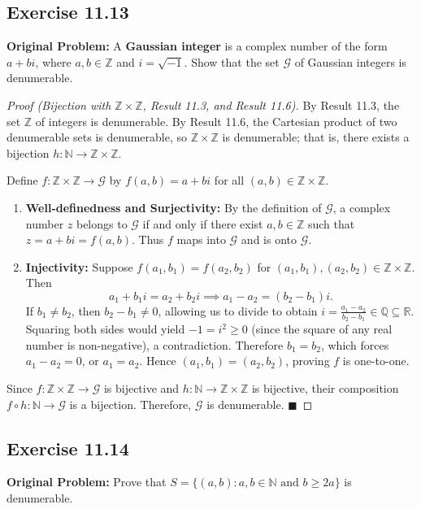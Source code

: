 \documentclass[11pt, letterpaper]{article}
\theoremstyle{definition}
\theoremstyle{remark}
\begin{document}
\subsection*{Exercise 11.13}
\textbf{Original Problem:} A \textbf{Gaussian integer} is a complex number of the form $a + bi$, where $a, b \in \mathbb{Z}$ and $i = \sqrt{-1}$. Show that the set $\mathcal{G}$ of Gaussian integers is denumerable.

\begin{proof}[Proof (Bijection with $\mathbb{Z} \times \mathbb{Z}$, Result 11.3, and Result 11.6)]
By Result 11.3, the set $\mathbb{Z}$ of integers is denumerable. By Result 11.6, the Cartesian product of two denumerable sets is denumerable, so $\mathbb{Z} \times \mathbb{Z}$ is denumerable; that is, there exists a bijection $h : \mathbb{N} \to \mathbb{Z} \times \mathbb{Z}$.

Define $f : \mathbb{Z} \times \mathbb{Z} \to \mathcal{G}$ by $f(a, b) = a + bi$ for all $(a, b) \in \mathbb{Z} \times \mathbb{Z}$.
\begin{enumerate}[label=(\arabic*)]
    \item \textbf{Well-definedness and Surjectivity:} By the definition of $\mathcal{G}$, a complex number $z$ belongs to $\mathcal{G}$ if and only if there exist $a, b \in \mathbb{Z}$ such that $z = a + bi = f(a, b)$. Thus $f$ maps into $\mathcal{G}$ and is onto $\mathcal{G}$.
    
    \item \textbf{Injectivity:} Suppose $f(a_1, b_1) = f(a_2, b_2)$ for $(a_1, b_1), (a_2, b_2) \in \mathbb{Z} \times \mathbb{Z}$. Then
    \[
    a_1 + b_1 i = a_2 + b_2 i \implies a_1 - a_2 = (b_2 - b_1)i.
    \]
    If $b_1 \neq b_2$, then $b_2 - b_1 \neq 0$, allowing us to divide to obtain $i = \frac{a_1 - a_2}{b_2 - b_1} \in \mathbb{Q} \subseteq \mathbb{R}$. Squaring both sides would yield $-1 = i^2 \geq 0$ (since the square of any real number is non-negative), a contradiction. Therefore $b_1 = b_2$, which forces $a_1 - a_2 = 0$, or $a_1 = a_2$. Hence $(a_1, b_1) = (a_2, b_2)$, proving $f$ is one-to-one.
\end{enumerate}
Since $f : \mathbb{Z} \times \mathbb{Z} \to \mathcal{G}$ is bijective and $h : \mathbb{N} \to \mathbb{Z} \times \mathbb{Z}$ is bijective, their composition $f \circ h : \mathbb{N} \to \mathcal{G}$ is a bijection. Therefore, $\mathcal{G}$ is denumerable. $\blacksquare$
\end{proof}

\subsection*{Exercise 11.14}
\textbf{Original Problem:} Prove that $S = \{(a, b) : a, b \in \mathbb{N} \text{ and } b \geq 2a\}$ is denumerable.
\end{document}
